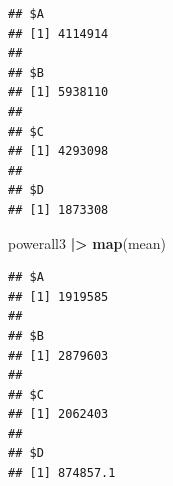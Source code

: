 \documentclass[
]{article}
\newenvironment{Shaded}{\begin{snugshade}}{\end{snugshade}}
\newcommand{\FunctionTok}[1]{\textcolor[rgb]{0.13,0.29,0.53}{\textbf{#1}}}
\newcommand{\NormalTok}[1]{#1}
\newcommand{\SpecialCharTok}[1]{\textcolor[rgb]{0.81,0.36,0.00}{\textbf{#1}}}
\begin{document}
\begin{verbatim}
## $A
## [1] 4114914
## 
## $B
## [1] 5938110
## 
## $C
## [1] 4293098
## 
## $D
## [1] 1873308
\end{verbatim}

\begin{Shaded}
\begin{Highlighting}[]
\NormalTok{powerall3 }\SpecialCharTok{|\textgreater{}} \FunctionTok{map}\NormalTok{(mean)}
\end{Highlighting}
\end{Shaded}

\begin{verbatim}
## $A
## [1] 1919585
## 
## $B
## [1] 2879603
## 
## $C
## [1] 2062403
## 
## $D
## [1] 874857.1
\end{verbatim}
\end{document}
